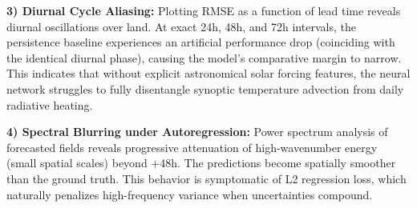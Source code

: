 \textbf{3) Diurnal Cycle Aliasing:}
Plotting RMSE as a function of lead time reveals diurnal oscillations over land. At exact 24h, 48h, and 72h intervals, the persistence baseline experiences an artificial performance drop (coinciding with the identical diurnal phase), causing the model's comparative margin to narrow. This indicates that without explicit astronomical solar forcing features, the neural network struggles to fully disentangle synoptic temperature advection from daily radiative heating.

\textbf{4) Spectral Blurring under Autoregression:}
Power spectrum analysis of forecasted fields reveals progressive attenuation of high-wavenumber energy (small spatial scales) beyond +48h. The predictions become spatially smoother than the ground truth. This behavior is symptomatic of L2 regression loss, which naturally penalizes high-frequency variance when uncertainties compound.
